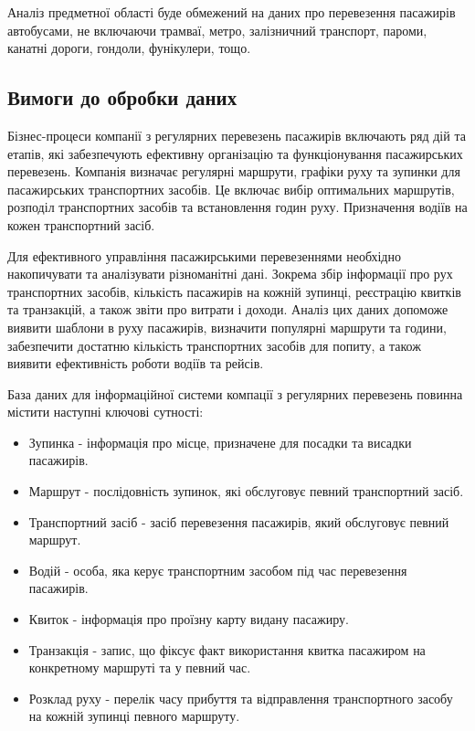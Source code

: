 \documentclass[oneside,14pt]{extarticle}
\begin{document}
Аналіз предметної області буде обмежений на даних про перевезення пасажирів автобусами, не включаючи трамваї, метро, залізничний транспорт, пароми, канатні дороги, гондоли, фунікулери, тощо.

\subsection{Вимоги до обробки даних}
Бізнес-процеси компанії з регулярних перевезень пасажирів включають ряд дій та етапів, які забезпечують ефективну організацію та функціонування пасажирських перевезень. Компанія визначає регулярні маршрути, графіки руху та зупинки для пасажирських транспортних засобів. Це включає вибір оптимальних маршрутів, розподіл транспортних засобів та встановлення годин руху. Призначення водіїв на кожен транспортний засіб.

Для ефективного управління пасажирськими перевезеннями необхідно накопичувати та аналізувати різноманітні дані. Зокрема збір інформації про рух транспортних засобів, кількість пасажирів на кожній зупинці, реєстрацію квитків та транзакцій, а також звіти про витрати і доходи. Аналіз цих даних допоможе виявити шаблони в руху пасажирів, визначити популярні маршрути та години, забезпечити достатню кількість транспортних засобів для попиту, а також виявити ефективність роботи водіїв та рейсів.

База даних для інформаційної системи компації з регулярних перевезень повинна містити наступні ключові сутності:
\begin{itemize}
\item Зупинка - інформація про місце, призначене для посадки та висадки пасажирів.
\item Маршрут - послідовність зупинок, які обслуговує певний транспортний засіб.
\item Транспортний засіб - засіб перевезення пасажирів, який обслуговує певний маршрут.
\item Водій - особа, яка керує транспортним засобом під час перевезення пасажирів.
\item Квиток - інформація про проїзну карту видану пасажиру.
\item Транзакція - запис, що фіксує факт використання квитка пасажиром на конкретному маршруті та у певний час.
\item Розклад руху - перелік часу прибуття та відправлення транспортного засобу на кожній зупинці певного маршруту.
\end{itemize}
\end{document}
